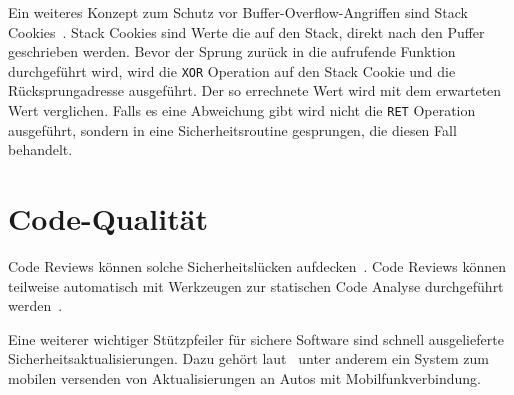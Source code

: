 Ein weiteres Konzept zum Schutz vor Buffer-Overflow-Angriffen sind Stack
Cookies~\cite{Bray2002}. Stack Cookies sind Werte die auf den Stack, direkt
nach den Puffer geschrieben werden. Bevor der Sprung zurück in
die aufrufende Funktion durchgeführt wird, wird die \verb+XOR+ Operation auf
den Stack Cookie und die Rücksprungadresse ausgeführt. Der so errechnete Wert
wird mit dem erwarteten Wert verglichen. Falls es eine Abweichung gibt wird
nicht die \verb+RET+ Operation ausgeführt, sondern in eine Sicherheitsroutine
gesprungen, die diesen Fall behandelt.



\section{Code-Qualität}
Code Reviews können solche Sicherheitslücken aufdecken~\cite{Howard2006}.
Code Reviews können teilweise automatisch mit Werkzeugen zur statischen Code
Analyse durchgeführt werden~\cite{McGraw2008}.

Eine weiterer wichtiger Stützpfeiler für sichere Software sind schnell
ausgelieferte Sicherheitsaktualisierungen. Dazu gehört laut~\cite{Mahaffey2015}
unter anderem ein System zum mobilen versenden von Aktualisierungen an Autos
mit Mobilfunkverbindung.